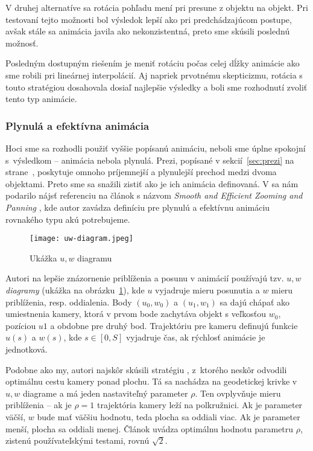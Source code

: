 V druhej alternatíve sa rotácia pohľadu mení pri presune z objektu na objekt. Pri testovaní tejto možnosti bol výsledok lepší ako pri predchádzajúcom postupe, avšak stále sa animácia javila ako nekonzistentná, preto sme skúsili poslednú možnosť.

Posledným dostupným riešením je meniť rotáciu počas celej dĺžky animácie ako sme robili pri lineárnej interpolácií. Aj napriek prvotnému skepticizmu, rotácia s touto stratégiou  dosahovala dosiaľ najlepšie výsledky a boli sme rozhodnutí zvoliť tento typ animácie.

\subsubsection{Plynulá a efektívna animácia}

Hoci sme sa rozhodli použiť vyššie popísanú animáciu, neboli sme úplne spokojní s~výsledkom -- animácia nebola plynulá. Prezi, popísané v sekcií~\ref{sec:prezi} na strane~\pageref{sec:prezi}, poskytuje omnoho príjemnejší a plynulejší prechod medzi dvoma objektami. Preto sme sa snažili zistiť ako je ich animácia definovaná. V \cite{prezi} sa nám podarilo nájsť referenciu na článok s názvom \textit{Smooth and Efficient Zooming and Panning} \cite{wijk1}, kde autor zavádza definíciu pre plynulú a efektívnu animáciu rovnakého typu akú potrebujeme.

\begin{figure}
 \centering
 \texttt{[image: uw-diagram.jpeg]}
 \caption{Ukážka $u,w$ diagramu\label{fig:uw-diagram}}
\end{figure}

Autori na lepšie znázornenie priblíženia a posunu v animácií používajú tzv. \textit{$u,w$ diagramy} \cite{uw-diagrams} (ukážka na obrázku~\ref{fig:uw-diagram}), kde $u$ vyjadruje mieru posunutia a $w$ mieru priblíženia, resp. oddialenia. Body $(u_0,w_0)$ a $(u_1,w_1)$ sa dajú chápať ako umiestnenia kamery, ktorá v prvom bode zachytáva objekt s veľkosťou $w_0$, pozíciou $u1$ a obdobne pre druhý bod. Trajektóriu pre kameru definujú funkcie $u(s)$ a $w(s)$, kde $s \in [0,S]$ vyjadruje čas, ak rýchlosť animácie je jednotková.

Podobne ako my, autori najskôr skúsili stratégiu , z~ktorého neskôr odvodili optimálnu cestu kamery ponad plochu. Tá sa nachádza na geodetickej  krivke v $u,w$ diagrame a má jeden nastaviteľný parameter $\rho$. Ten ovplyvňuje mieru priblíženia -- ak je $\rho = 1$ trajektória kamery leží na polkružnici. Ak je parameter väčší, $w$ bude mať väčšiu hodnotu, teda plocha sa oddiali viac. Ak je parameter menší, plocha sa oddiali menej. Článok uvádza optimálnu hodnotu parametru $\rho$, zistenú používateľskými testami, rovnú $\sqrt{2}$.

